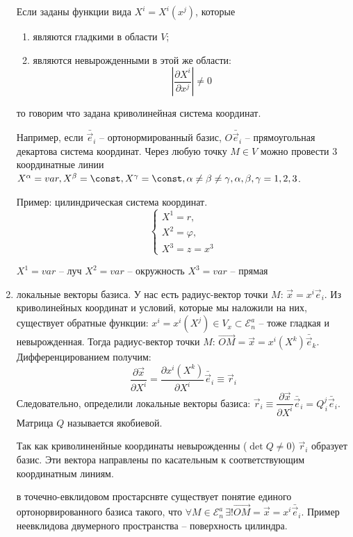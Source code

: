 \begin{enumerate}
    Если заданы функции вида $X^i = X^i (x^j)$, которые
    \begin{enumerate}
      \item являются гладкими в области $V$;
      \item являются невырожденными в этой же области:
        \[
          \left| \dfrac{\partial X^i}{\partial x^j} \right| \neq 0
        \]
    \end{enumerate}
    то говорим что задана криволинейная система координат.
  
    Например, если $\bar{\vec{e}}_i$ -- ортонормированный базис, $O\bar{\vec{e}}_i$ -- прямоугольная
    декартова система координат. Через любую точку $M \in V$ можно провести 3 координатные линии
    $X^\alpha = var, X^{\beta} = \const, X^\gamma = \const, \alpha \neq \beta \neq \gamma, \alpha, \beta, \gamma = 1, 2, 3$.

    Пример: цилиндрическая система координат. 
    \[
      \begin{cases}
        X^1 = r, \\
        X^2 = \varphi, \\
        X^3 = z = x^3
      \end{cases}
    \]

    $X^1 = var$ -- луч
    $X^2 = var$ -- окружность
    $X^3 = var$ -- прямая

  \item локальные векторы базиса. У нас есть радиус-вектор точки $M$: $\vec{x} = x^i \vec{e}_i$. 
    Из криволинейных координат и условий, которые мы наложили на них, существует обратные функции:
    $x^i = x^i(X^j) \in V_x \subset \mathcal{E}_n^a$ -- тоже гладкая и невырожденная. Тогда 
    радиус-вектор точки $M$: $\vec{OM} = \vec{x} = x^i(X^k) \bar{\vec{e}}_k$. Дифференцированием
    получим:
    \[
      \dfrac{\partial \vec{x}}{\partial X^i} = \dfrac{\partial x^i (X^k)}{\partial X^i} \bar{\vec{e}}_i
      \equiv \vec{r}_i
    \]
    Следовательно, определили локальные векторы базиса: 
    $\vec{r}_i \equiv \dfrac{\partial \vec{x}}{\partial X^i} \bar{\vec{e}}_i
    = Q^j_{\, i} \bar{\vec{e}}_i$. Матрица $Q$ называется якобиевой.

    Так как криволиненйные координаты невырожденны ($\det Q \neq 0$) $\vec{r}_i$ образует 
    базис. Эти вектора направлены по касательным к соответствующим координатным линиям.

    в точечно-евклидовом простарснвте существует понятие единого ортонорвированного базиса такого,
    что $\forall M \in \mathcal{E}_n^a \, \exists! \vec{OM} = \vec{x} = x^i \bar{\vec{e}}_i$.
    Пример неевклидова двумерного пространства -- поверхность цилиндра.


\end{enumerate}
